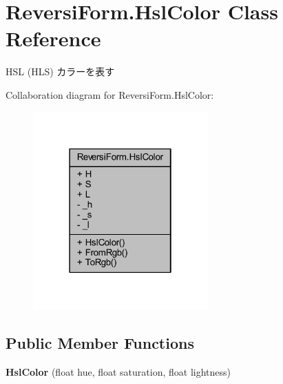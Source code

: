 \hypertarget{class_reversi_form_1_1_hsl_color}{}\section{Reversi\+Form.\+Hsl\+Color Class Reference}
\label{class_reversi_form_1_1_hsl_color}


H\+SL (H\+LS) カラーを表す  




Collaboration diagram for Reversi\+Form.\+Hsl\+Color\+:
\nopagebreak
\begin{figure}[H]
\begin{center}
\leavevmode
\includegraphics[width=190pt]{class_reversi_form_1_1_hsl_color__coll__graph}
\end{center}
\end{figure}
\subsection*{Public Member Functions}
\begin{DoxyCompactItemize}
\item 
\mbox{\label{class_reversi_form_1_1_hsl_color_ada60003dff54b8b81df385bd37b23982}} 
{\bfseries Hsl\+Color} (float hue, float saturation, float lightness)
\end{DoxyCompactItemize}
